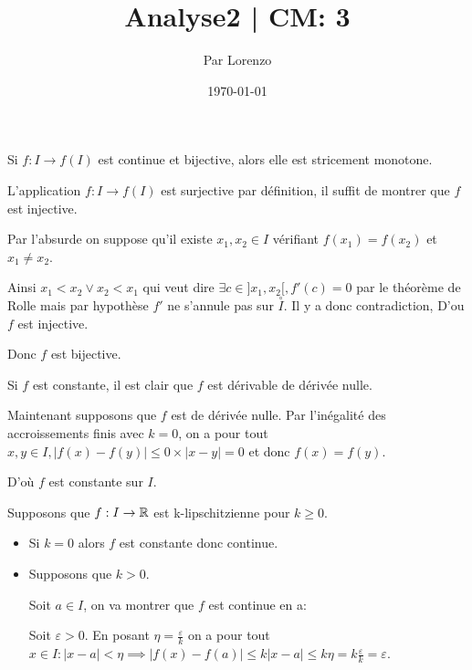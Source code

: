 \documentclass[a4paper, 12pt]{article}
\title{Analyse2 | CM: 3}
\author{Par Lorenzo}
\date{\today}
\begin{document}
\maketitle

\begin{demonstration}
    Si $f: I \rightarrow f(I)$ est continue et bijective, alors elle est stricement monotone.

    L'application $f: I \rightarrow f(I)$ est surjective par définition, il suffit de montrer que $f$ est injective.

    Par l'absurde on suppose qu'il existe $x_1, x_2 \in I$ vérifiant $f(x_1) = f(x_2)$ et $x_1 \neq x_2$.

    Ainsi $x_1 < x_2 \lor x_2 < x_1$ qui veut dire $\exists c \in ]x_1, x_2[, f'(c) = 0$ par le théorème de Rolle mais par hypothèse $f'$ ne s'annule pas sur $\stackrel{\circ}{I}$.
    Il y a donc contradiction, D'ou $f$ est injective.

    \begin{rdem}
        Donc $f$ est bijective.
    \end{rdem}
\end{demonstration}

\begin{demonstration}
    Si $f$ est constante, il est clair que $f$ est dérivable de dérivée nulle.

    Maintenant supposons que $f$ est de dérivée nulle. Par l'inégalité des accroissements finis avec $k = 0$,
    on a pour tout $x, y \in I, |f(x) - f(y)| \leq 0 \times |x - y| = 0$ et donc $f(x) = f(y)$.

    D'où $f$ est constante sur $I$.
\end{demonstration}

\begin{demonstration}
    Supposons que $f: I \rightarrow \mathbb{R}$ est k-lipschitzienne pour $k \geq 0$.

    \begin{itemize}
        \item Si $k = 0$ alors $f$ est constante donc continue.
        \item Supposons que $k \gt 0$.
        
        Soit $a \in I$, on va montrer que $f$ est continue en a:

        Soit $\varepsilon \gt 0$. En posant $\eta = \frac{\varepsilon}{k}$ on a pour tout $x \in I: |x - a| \lt \eta \implies |f(x) - f(a)| \leq k|x - a| \leq k \eta = k \frac{\varepsilon}{k} = \varepsilon$.
    \end{itemize}
\end{demonstration}
\end{document}
